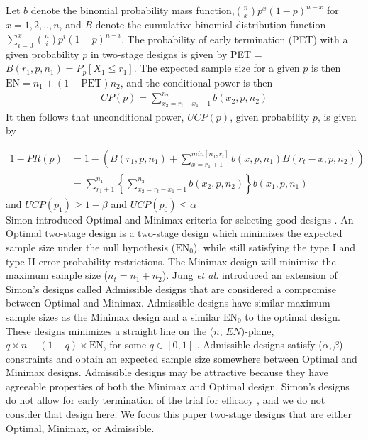 \documentclass[12pt]{report}\usepackage[]{graphicx}\usepackage[]{color}
\newlength{\li}\setlength{\li}{14.48pt}
\newlength{\di}\setlength{\di}{-3.5mm}
\begin{document}
\indent Let $b$ denote the binomial probability mass function,${n \choose x} p^x(1-p)^{n-x}$ for $x =  1,2,..,n$, and $B$ denote the cumulative binomial distribution function $\sum_{i=0}^x {n \choose i} p^i(1-p)^{n-i}$. The probability of early termination (PET) with a given probability $p$ in two-stage designs is given by PET = $B(r_1, p, n_1) = P_p[X_1 \leq r_1]$. The expected sample size for a given $p$ is then $\mbox{EN} = n_1 + (1-\mbox{PET})n_2$, and the conditional power is then  
\begin{equation}
\begin{aligned}
CP(p) = \sum_{x_2 = r_t-x_1+1}^{n_2} b(x_2, p, n_2)
\end{aligned}
\end{equation}
It then follows that unconditional power, $UCP(p)$, given probability $p$, is given by 

\begin{equation}
\begin{aligned}
1-PR(p) &= 1 - \left( B(r_1, p, n_1) + \sum_{x=r_1+1}^{min[n_1,{r_t}]} b(x, p, n_1) B(r_t-x,p,n_2) \right) \\
&= \sum_{r_1+1}^{n_1} \left\{\sum_{x_2 = r_t-x_1+1}^{n_2} b(x_2, p, n_2) \right\} b(x_1, p, n_1)
\end{aligned}
\end{equation}
and $UCP(p_1) \geq 1-\beta$ and $UCP(p_0) \leq \alpha$ \\


\indent Simon introduced Optimal and Minimax criteria for selecting good designs \cite{Simon}. An Optimal two-stage design is a two-stage design which minimizes the expected sample size under the null hypothesis ($\mbox{EN}_0$). while still satisfying the type I and type II error probability restrictions. The Minimax design will minimize the maximum sample size ($n_t = n_1 + n_2$). Jung \textit{et al.} \cite{Jung} introduced an extension of Simon's designs called Admissible designs that are considered a compromise between Optimal and Minimax. Admissible designs  have similar maximum sample sizes as the Minimax design and a similar $\mbox{EN}_0$ to the optimal design.  These designs minimizes a straight line on the ($n$, $EN$)-plane, $q \times n + (1-q) \times \mbox{EN}$, for some $q \in [0,1]$ \cite{Jung}. Admissible designs satisfy ($\alpha, \beta$) constraints and obtain an expected sample size somewhere between Optimal and Minimax designs. Admissible designs may be attractive because they have agreeable properties of both the Minimax and Optimal design.  Simon's designs do not allow for early termination of the trial for efficacy \cite{Simon}, and we do not consider that design here. We focus this paper two-stage designs that are either Optimal, Minimax, or Admissible. 
\end{document}
